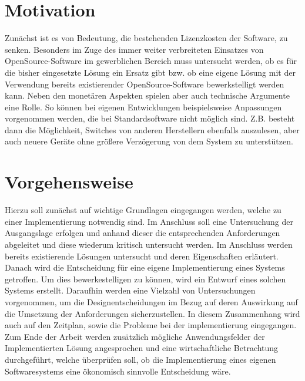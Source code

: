 \section{Motivation}

Zunächst ist es von Bedeutung, die bestehenden Lizenzkosten der Software, zu senken.
Besonders im Zuge des immer weiter verbreiteten Einsatzes von OpenSource-Software im gewerblichen Bereich muss untersucht werden, ob es für die bisher eingesetzte Lösung ein Ersatz gibt bzw. ob eine eigene Lösung mit der Verwendung bereits existierender OpenSource-Software bewerkstelligt werden kann.
Neben den monetären Aspekten spielen aber auch technische Argumente eine Rolle.
So können bei eigenen Entwicklungen beispielsweise Anpassungen vorgenommen werden, die bei Standardsoftware nicht möglich sind.
Z.B. besteht dann die Möglichkeit, Switches von anderen Herstellern ebenfalls auszulesen, aber auch neuere Geräte ohne größere Verzögerung von dem System zu unterstützen.

\section{Vorgehensweise}

Hierzu soll zunächst auf wichtige Grundlagen eingegangen werden, welche zu einer Implementierung notwendig sind.
Im Anschluss soll eine Untersuchung der Ausgangslage erfolgen und anhand dieser die entsprechenden Anforderungen abgeleitet und diese wiederum kritisch untersucht werden.
Im Anschluss werden bereits existierende Lösungen untersucht und deren Eigenschaften erläutert.
Danach wird die Entscheidung für eine eigene Implementierung eines Systems getroffen.
Um dies bewerkestelligen zu können, wird ein Entwurf eines solchen Systems erstellt.
Daraufhin werden eine Vielzahl von Untersuchungen vorgenommen, um die Designentscheidungen im Bezug auf deren Auswirkung auf die Umsetzung der Anforderungen sicherzustellen.
In diesem Zusammenhang wird auch auf den Zeitplan, sowie die Probleme bei der implementierung eingegangen.
Zum Ende der Arbeit werden zusätzlich mögliche Anwendungsfelder der Implementierten Lösung angesprochen und eine wirtschaftliche Betrachtung durchgeführt, welche überprüfen soll, ob die Implementierung eines eigenen Softwaresystems eine ökonomisch sinnvolle Entscheidung wäre.\\